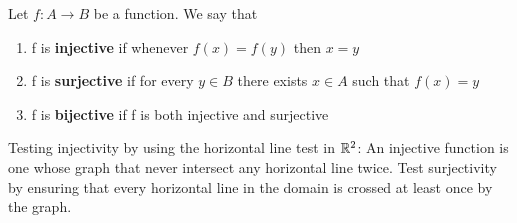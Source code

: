 \documentclass[11pt]{article}
\begin{document}
\begin{defn}
  \label{jectivity}
  Let $f: A \to B$ be a function. We say that
  \begin{enumerate}
    \item f is \textbf{injective} if whenever $f(x) = f(y)$ then $x=y$
    \item f is \textbf{surjective} if for every $y\in B$ there exists $x\in A$ such that $f(x) = y$
    \item f is \textbf{bijective} if f is both injective and surjective
  \end{enumerate}

  \begin{rem}
    Testing injectivity by using the horizontal line test in $\mathbb{R}^2$: An injective function is one whose graph that never intersect any horizontal line twice. Test surjectivity by ensuring that every horizontal line in the domain is crossed at least once by the graph.
  \end{rem}
\end{defn}
\end{document}
